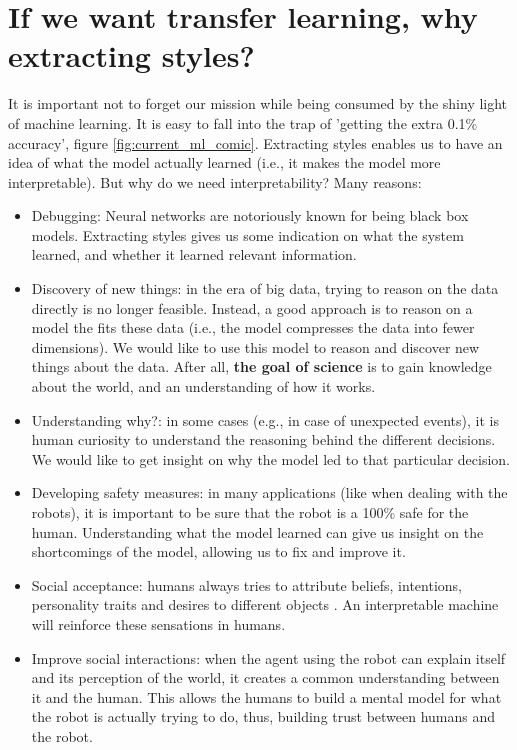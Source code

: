 \section{If we want transfer learning, why extracting styles?}
  \par It is important not to forget our mission while being consumed by the shiny light of machine learning. It is easy to fall into the trap of 'getting the extra 0.1\% accuracy', figure \ref{fig:current_ml_comic}. Extracting styles enables us to have an idea of what the model actually learned (i.e., it makes the model more interpretable). But why do we need interpretability? Many reasons:
  \begin{itemize}
    \item Debugging: Neural networks are notoriously known for being black box models. Extracting styles gives us some indication on what the system learned, and whether it learned relevant information.
    \item Discovery of new things: in the era of big data, trying to reason on the data directly is no longer feasible. Instead, a good approach is to reason on a model the fits these data (i.e., the model compresses the data into fewer dimensions). We would like to use this model to reason and discover new things about the data. After all, \textbf{the goal of science} is to gain knowledge about the world, and an understanding of how it works.
    \item Understanding why?: in some cases (e.g., in case of unexpected events), it is human curiosity to understand the reasoning behind the different decisions. We would like to get insight on why the model led to that particular decision.
    \item Developing safety measures: in many applications (like when dealing with the robots), it is important to be sure that the robot is a 100\% safe for the human. Understanding what the model learned can give us insight on the shortcomings of the model, allowing us to fix and improve it.
    \item Social acceptance: humans always tries to attribute beliefs, intentions, personality traits and desires to different objects \citep{heider1944experimental}. An interpretable machine will reinforce these sensations in humans.
    \item Improve social interactions: when the agent using the robot can explain itself and its perception of the world, it creates a common understanding between it and the human. This allows the humans to build a mental model for what the robot is actually trying to do, thus, building trust between humans and the robot.
  \end{itemize}

